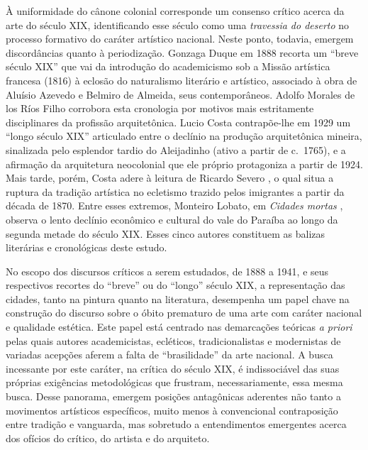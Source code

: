À uniformidade do cânone colonial corresponde um consenso crítico acerca
da arte do século XIX, identificando esse século como uma
\emph{travessia do deserto} no processo formativo do caráter artístico
nacional. Neste ponto, todavia, emergem discordâncias quanto à
periodização. Gonzaga Duque em 1888 \autocite*{gonzagaduque:1995arte}
recorta um ``breve século XIX'' que vai da introdução do academicismo
sob a Missão artística francesa (1816) à eclosão do naturalismo
literário e artístico, associado à obra de Aluísio Azevedo e Belmiro de
Almeida, seus contemporâneos. Adolfo Morales de los Ríos Filho
\autocite*{morales:1941grandjean} corrobora esta cronologia por motivos
mais estritamente disciplinares da profissão arquitetônica. Lucio Costa
\autocite*{costa:2007aleijadinho} contrapõe-lhe em 1929 um ``longo
século XIX'' articulado entre o declínio na produção arquitetônica
mineira, sinalizada pelo esplendor tardio do Aleijadinho (ativo a partir
de c.~1765), e a afirmação da arquitetura neocolonial que ele próprio
protagoniza a partir de 1924. Mais tarde, porém, Costa adere à leitura
de Ricardo Severo \autocite*{severo:1917arte}, o qual situa a ruptura da
tradição artística no ecletismo trazido pelos imigrantes a partir da
década de 1870. Entre esses extremos, Monteiro Lobato, em \emph{Cidades
mortas} \autocite*{monteirolobato:1919cidades}, observa o lento declínio
econômico e cultural do vale do Paraíba ao longo da segunda metade do
século XIX. Esses cinco autores constituem as balizas literárias e
cronológicas deste estudo.

No escopo dos discursos críticos a serem estudados, de 1888 a 1941, e
seus respectivos recortes do ``breve'' ou do ``longo'' século XIX, a
representação das cidades, tanto na pintura quanto na literatura,
desempenha um papel chave na construção do discurso sobre o óbito
prematuro de uma arte com caráter nacional e qualidade estética. Este
papel está centrado nas demarcações teóricas \emph{a priori} pelas quais
autores academicistas, ecléticos, tradicionalistas e modernistas de
variadas acepções aferem a falta de ``brasilidade'' da arte nacional. A
busca incessante por este caráter, na crítica do século XIX, é
indissociável das suas próprias exigências metodológicas que frustram,
necessariamente, essa mesma busca. Desse panorama, emergem posições
antagônicas aderentes não tanto a movimentos artísticos específicos,
muito menos à convencional contraposição entre tradição e vanguarda, mas
sobretudo a entendimentos emergentes acerca dos ofícios do crítico, do
artista e do arquiteto.

